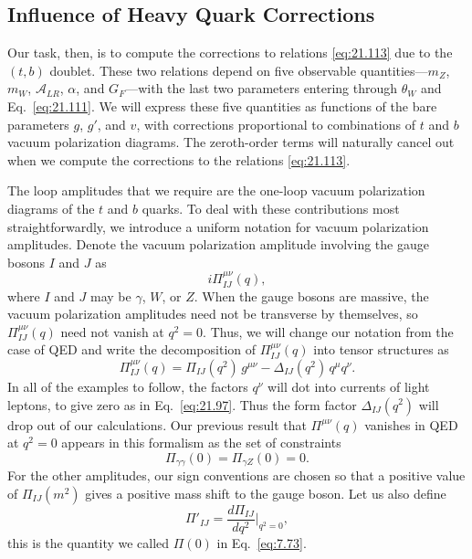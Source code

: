 \subsection{Influence of Heavy Quark Corrections}

Our task, then, is to compute the corrections to relations \eqref{eq:21.113}
due to the $(t, b)$ doublet.  These two relations depend on five observable
quantities---$m_Z$, $m_W$, $\mathcal{A}_{LR}$, $\alpha$, and $G_F$---with
the last two parameters entering through $\theta_W$ and Eq.~\eqref{eq:21.111}.
We will express these five quantities as functions of the bare parameters
$g$, $g'$, and $v$, with corrections proportional to combinations of $t$ and
$b$ vacuum polarization diagrams.  The zeroth-order terms will naturally
cancel out when we compute the corrections to the relations \eqref{eq:21.113}.

The loop amplitudes that we require are the one-loop vacuum polarization
diagrams of the $t$ and $b$ quarks.  To
deal with these contributions most straightforwardly, we introduce a uniform
notation for vacuum polarization amplitudes.  Denote the vacuum
polarization amplitude involving the gauge bosons $I$ and $J$ as
\begin{equation}
  i\Pi^{\mu\nu}_{IJ}(q) ,
  \label{eq:21.114}
\end{equation}
where $I$ and $J$ may be $\gamma$, $W$, or $Z$.  When the gauge bosons are
massive, the vacuum polarization amplitudes need not be transverse by
themselves, so $\Pi^{\mu\nu}_{IJ}(q)$ need not vanish at $q^2 = 0$.  Thus, we
will change our notation from the case of QED and write the decomposition of
$\Pi^{\mu\nu}_{IJ}(q)$ into tensor structures as
\begin{equation}
  \Pi^{\mu\nu}_{IJ}(q) = \Pi_{IJ}(q^2)\,g^{\mu\nu} - \Delta_{IJ}(q^2)\,q^\mu q^\nu
  .
  \label{eq:21.115}
\end{equation}
In all of the examples to follow, the factors $q^\nu$ will dot into currents
of light leptons, to give zero as in Eq.~\eqref{eq:21.97}.  Thus the form
factor $\Delta_{IJ}(q^2)$ will drop out of our calculations.  Our previous
result that $\Pi^{\mu\nu}(q)$ vanishes in QED at $q^2 = 0$ appears in this
formalism as the set of constraints
\begin{equation}
  \Pi_{\gamma\gamma}(0) = \Pi_{\gamma Z}(0) = 0 .
  \label{eq:21.116}
\end{equation}
For the other amplitudes, our sign conventions are chosen so that a positive
value of $\Pi_{IJ}(m^2)$ gives a positive mass shift to the gauge boson.  Let
us also define
\begin{equation}
  \Pi'_{IJ} = \frac{d\Pi_{IJ}}{dq^2}\Big|_{q^2=0},
  \label{eq:21.117}
\end{equation}
this is the quantity we called $\Pi(0)$ in Eq.~\eqref{eq:7.73}.

